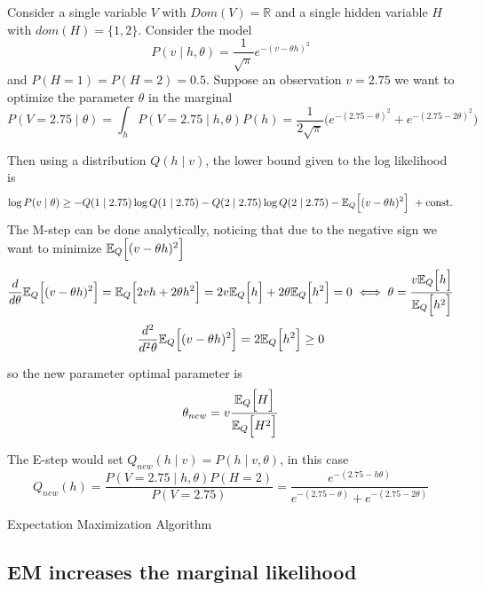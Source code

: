 \begin{exampleth}
  Consider a single variable \(V\) with \(Dom(V) = \mathbb{R}\) and a single hidden variable \(H\) with \(dom(H) = \{1,2\}\). Consider the model
  \[
    P(v \mid h, \theta) = \frac{1}{\sqrt{\pi}}e^{-(v - \theta h)^{2}}
  \]
  and \(P(H = 1) = P(H = 2) = 0.5\). Suppose an observation \(v = 2.75\) we want to optimize the parameter \(\theta\) in the marginal
  \[
    P(V = 2.75 \mid \theta) = \int_{h} P(V = 2.75 \mid h, \theta) P(h) = \frac{1}{2\sqrt{\pi}}\big( e^{-(2.75 - \theta)^{2}} + e^{-(2.75 - 2\theta)^{2}} \big)
  \]

  Then using a distribution \(Q(h \mid v)\), the lower bound given to the log likelihood is
  \[
    \log{P(v \mid \theta)} \geq -Q(1 \mid 2.75)\log{Q(1 \mid 2.75)} - Q(2 \mid 2.75)\log{Q(2 \mid 2.75)} - \mathbb{E}_{Q}\Big[(v - \theta h)^{2}\Big]\ + \text{const.}
  \]
  The M-step can be done analytically, noticing that due to the negative sign we want to minimize \(\mathbb{E}_{Q}\Big[(v - \theta h)^{2}\Big]\)
  \[
    \frac{d}{d\theta}\mathbb{E}_{Q}\Big[(v - \theta h)^{2}\Big] = \mathbb{E}_{Q}\Big[ 2 v h + 2\theta h^{2} \Big] = 2v\mathbb{E}_{Q}\Big[h\Big] + 2\theta \mathbb{E}_{Q}\Big[h^{2}\Big] = 0 \iff \theta = \frac{v\mathbb{E}_{Q}\Big[h\Big]}{\mathbb{E}_{Q}\Big[h^{2}\Big]}
  \]
  \[
     \frac{d^{2}}{d^{2}\theta}\mathbb{E}_{Q}\Big[(v - \theta h)^{2}\Big] = 2\mathbb{E}_{Q}\Big[h^{2}\Big] \geq 0
  \]

  so the new parameter optimal parameter is
  \[
    \theta_{new} = v \frac{\mathbb{E}_{Q}\Big[H\Big]}{\mathbb{E}_{Q}\Big[H^{2}\Big]}
  \]

  The E-step would set \(Q_{new}(h \mid v) = P(h \mid v , \theta)\), in this case
  \[
    Q_{new}(h) = \frac{P(V = 2.75 \mid h, \theta)P(H = 2)}{P(V = 2.75)} = \frac{e^{-(2.75-h\theta)}}{ e^{-(2.75-\theta)} + e^{-(2.75-2\theta)}  }
  \]
\end{exampleth}

 \begin{algorithm}[t]
  \SetAlgoLined
  \KwRet{\(\theta\)}\;
  \caption{Expectation Maximization Algorithm}
  \label{alg:em}
\end{algorithm}

\subsection{EM increases the marginal likelihood}


